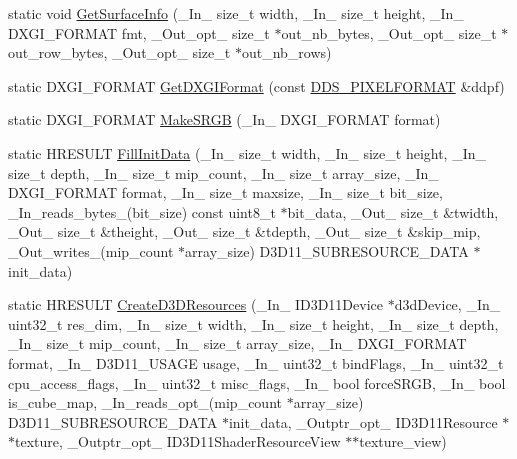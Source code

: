 \begin{DoxyCompactItemize}
\item 
static void \hyperlink{namespacemage_a7b67bb6f38f3e787fb3561d236b88bd2}{Get\+Surface\+Info} (\+\_\+\+In\+\_\+ size\+\_\+t width, \+\_\+\+In\+\_\+ size\+\_\+t height, \+\_\+\+In\+\_\+ D\+X\+G\+I\+\_\+\+F\+O\+R\+M\+AT fmt, \+\_\+\+Out\+\_\+opt\+\_\+ size\+\_\+t $\ast$out\+\_\+nb\+\_\+bytes, \+\_\+\+Out\+\_\+opt\+\_\+ size\+\_\+t $\ast$out\+\_\+row\+\_\+bytes, \+\_\+\+Out\+\_\+opt\+\_\+ size\+\_\+t $\ast$out\+\_\+nb\+\_\+rows)
\item 
static D\+X\+G\+I\+\_\+\+F\+O\+R\+M\+AT \hyperlink{namespacemage_a4fecf9823aec7c5ba078acf6bd73f983}{Get\+D\+X\+G\+I\+Format} (const \hyperlink{structmage_1_1_d_d_s___p_i_x_e_l_f_o_r_m_a_t}{D\+D\+S\+\_\+\+P\+I\+X\+E\+L\+F\+O\+R\+M\+AT} \&ddpf)
\item 
static D\+X\+G\+I\+\_\+\+F\+O\+R\+M\+AT \hyperlink{namespacemage_a35ccdb42bbc027d3678b849fb962f3d3}{Make\+S\+R\+GB} (\+\_\+\+In\+\_\+ D\+X\+G\+I\+\_\+\+F\+O\+R\+M\+AT format)
\item 
static H\+R\+E\+S\+U\+LT \hyperlink{namespacemage_ac20162a68be6828c38072a3afb0711c1}{Fill\+Init\+Data} (\+\_\+\+In\+\_\+ size\+\_\+t width, \+\_\+\+In\+\_\+ size\+\_\+t height, \+\_\+\+In\+\_\+ size\+\_\+t depth, \+\_\+\+In\+\_\+ size\+\_\+t mip\+\_\+count, \+\_\+\+In\+\_\+ size\+\_\+t array\+\_\+size, \+\_\+\+In\+\_\+ D\+X\+G\+I\+\_\+\+F\+O\+R\+M\+AT format, \+\_\+\+In\+\_\+ size\+\_\+t maxsize, \+\_\+\+In\+\_\+ size\+\_\+t bit\+\_\+size, \+\_\+\+In\+\_\+reads\+\_\+bytes\+\_\+(bit\+\_\+size) const uint8\+\_\+t $\ast$bit\+\_\+data, \+\_\+\+Out\+\_\+ size\+\_\+t \&twidth, \+\_\+\+Out\+\_\+ size\+\_\+t \&theight, \+\_\+\+Out\+\_\+ size\+\_\+t \&tdepth, \+\_\+\+Out\+\_\+ size\+\_\+t \&skip\+\_\+mip, \+\_\+\+Out\+\_\+writes\+\_\+(mip\+\_\+count $\ast$array\+\_\+size) D3\+D11\+\_\+\+S\+U\+B\+R\+E\+S\+O\+U\+R\+C\+E\+\_\+\+D\+A\+TA $\ast$init\+\_\+data)
\item 
static H\+R\+E\+S\+U\+LT \hyperlink{namespacemage_a60c2e53d311a0972990ac7ed09552fe4}{Create\+D3\+D\+Resources} (\+\_\+\+In\+\_\+ I\+D3\+D11\+Device $\ast$d3d\+Device, \+\_\+\+In\+\_\+ uint32\+\_\+t res\+\_\+dim, \+\_\+\+In\+\_\+ size\+\_\+t width, \+\_\+\+In\+\_\+ size\+\_\+t height, \+\_\+\+In\+\_\+ size\+\_\+t depth, \+\_\+\+In\+\_\+ size\+\_\+t mip\+\_\+count, \+\_\+\+In\+\_\+ size\+\_\+t array\+\_\+size, \+\_\+\+In\+\_\+ D\+X\+G\+I\+\_\+\+F\+O\+R\+M\+AT format, \+\_\+\+In\+\_\+ D3\+D11\+\_\+\+U\+S\+A\+GE usage, \+\_\+\+In\+\_\+ uint32\+\_\+t bind\+Flags, \+\_\+\+In\+\_\+ uint32\+\_\+t cpu\+\_\+access\+\_\+flags, \+\_\+\+In\+\_\+ uint32\+\_\+t misc\+\_\+flags, \+\_\+\+In\+\_\+ bool force\+S\+R\+GB, \+\_\+\+In\+\_\+ bool is\+\_\+cube\+\_\+map, \+\_\+\+In\+\_\+reads\+\_\+opt\+\_\+(mip\+\_\+count $\ast$array\+\_\+size) D3\+D11\+\_\+\+S\+U\+B\+R\+E\+S\+O\+U\+R\+C\+E\+\_\+\+D\+A\+TA $\ast$init\+\_\+data, \+\_\+\+Outptr\+\_\+opt\+\_\+ I\+D3\+D11\+Resource $\ast$$\ast$texture, \+\_\+\+Outptr\+\_\+opt\+\_\+ I\+D3\+D11\+Shader\+Resource\+View $\ast$$\ast$texture\+\_\+view)

\end{DoxyCompactItemize}
